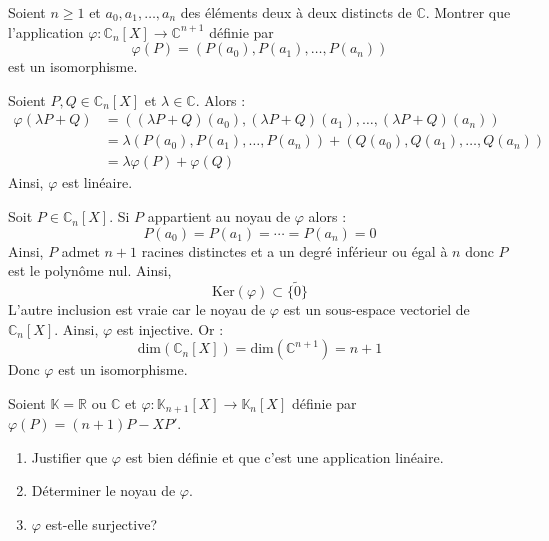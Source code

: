 \documentclass[a4paper,10pt]{report}
\begin{document}
\everymath{\displaystyle}

\begin{center}
\end{center}

\bigskip



\begin{Exercice}{} Soient $n \geq 1$ et $a_{0} ,a_{1} , \ldots ,a_{n}$ des éléments deux à deux distincts de $\mathbb{C}$. Montrer que l'application $\varphi \colon \mathbb{C}_n[X] \rightarrow \mathbb{C}^{n+1}$ définie par
  \[
  \varphi(P) = (P(a_{0}),P(a_{1}), \ldots ,P(a_{n}))
  \]
  est un isomorphisme.
\end{Exercice}

\corr Soient $P,Q \in \mathbb{C}_n[X]$ et $\lambda \in \mathbb{C}$. Alors :
\begin{align*}
\varphi(\lambda P + Q ) & = ((\lambda P+Q)(a_{0}),(\lambda P+Q)(a_{1}), \ldots , (\lambda P+Q)(a_{n})) \\
& = \lambda (P(a_{0}),P(a_{1}), \ldots ,P(a_{n})) + (Q(a_{0}),Q(a_{1}), \ldots ,Q(a_{n})) \\
& = \lambda \varphi(P) + \varphi(Q)
\end{align*}
Ainsi, $\varphi$ est linéaire.

\medskip

\noindent Soit $P \in \mathbb{C}_n[X]$. Si $P$ appartient au noyau de $\varphi$ alors :
$$ P(a_0) = P(a_1) = \cdots = P(a_n) = 0$$
Ainsi, $P$ admet $n+1$ racines distinctes et a un degré inférieur ou égal à $n$ donc $P$ est le polynôme nul. Ainsi,
$$ \textrm{Ker}(\varphi) \subset \lbrace \tilde{0} \rbrace$$
L'autre inclusion est vraie car le noyau de $\varphi$ est un sous-espace vectoriel de $\mathbb{C}_n[X]$. Ainsi, $\varphi$ est injective. Or :
$$ \textrm{dim}(\mathbb{C}_n[X]) = \textrm{dim}(\mathbb{C}^{n+1}) = n+1$$
Donc $\varphi$ est un isomorphisme.


\begin{Exercice}{} Soient $\mathbb{K}= \mathbb{R}$ ou $\mathbb{C}$ et $\varphi : \mathbb{K}_{n+1}[X]\rightarrow \mathbb{K}_{n}[X]$ définie par $\varphi(P) = (n + 1)P - XP'$.
    \begin{enumerate}
      \item
        Justifier que $\varphi$ est bien définie et que c'est une application linéaire.
      \item
        Déterminer le noyau de $\varphi$.
      \item
        $\varphi$ est-elle surjective?
    \end{enumerate}
\end{Exercice}
\end{document}
